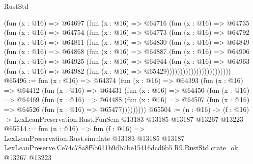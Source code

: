 \begin{lexlean}{RustStd}
\begin{coremodule}
                  (fun (x : @16) =>
                  @64697
                    (fun (x : @16) =>
                    @64716
                      (fun (x : @16) =>
                      @64735
                        (fun (x : @16) =>
                        @64754
                          (fun (x : @16) =>
                          @64773
                            (fun (x : @16) =>
                            @64792
                              (fun (x : @16) =>
                              @64811
                                (fun (x : @16) =>
                                @64830
                                  (fun (x : @16) =>
                                  @64849
                                    (fun (x : @16) =>
                                    @64868
                                      (fun (x : @16) =>
                                      @64887
                                        (fun (x : @16) =>
                                        @64906
                                          (fun (x : @16) =>
                                          @64925
                                            (fun (x : @16) =>
                                            @64944
                                              (fun (x : @16) =>
                                              @64963
                                                (fun (x : @16) =>
                                                @64982
                                                  (fun (x : @16) => @65429))))))))))))))))))))))))
@65496 := fun (x : @16) =>
  @64374
    (fun (x : @16) =>
    @64393
      (fun (x : @16) =>
      @64412
        (fun (x : @16) =>
        @64431
          (fun (x : @16) =>
          @64450
            (fun (x : @16) =>
            @64469
              (fun (x : @16) =>
              @64488
                (fun (x : @16) => @64507 (fun (x : @16) => @64526 (fun (x : @16) => @65477)))))))))
@65504 := (n : @16) ->
  (f : @16) -> LexLeanPreservation.Rust.FunSem @13183 @13185 @13187 @13267 @13223
@65514 := fun (n : @16) =>
  fun (f : @16) =>
  LexLeanPreservation.Rust.simulate
    @13183
    @13185
    @13187
    LexLeanPreserve.Ce74c78a8f5b611b9db7be15416dcd6b5.R9.RustStd.crate_ok
    @13267
    @13223
\end{coremodule}
\end{lexlean}

